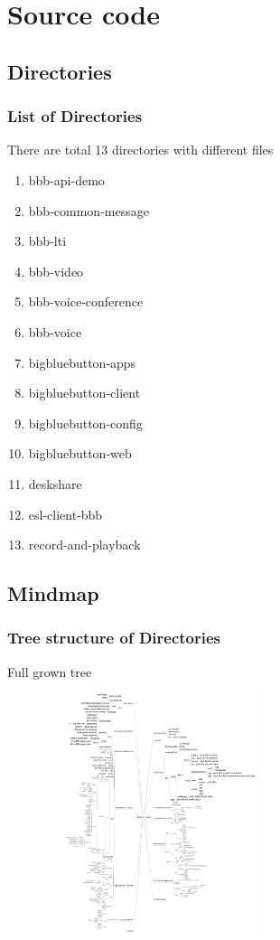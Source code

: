 \documentclass{beamer}
\begin{document}
\section{Source code}
\subsection*{Directories}
\begin{frame}
\frametitle{List of Directories}
{There are total 13 directories with different files}
\begin{small}
\begin{enumerate}

	\item{bbb-api-demo}
	\item{bbb-common-message}
	\item{bbb-lti}
	\item{bbb-video}
	\item{bbb-voice-conference}
	\item{bbb-voice}
	\item{bigbluebutton-apps}
	\item{bigbluebutton-client}
	\item{bigbluebutton-config}
	\item{bigbluebutton-web}
	\item{deskshare}
	\item{esl-client-bbb}
	\item record-and-playback 

\end{enumerate}
\end{small}
\end{frame}



\subsection*{Mindmap}
\begin{frame}
\frametitle{Tree structure of Directories}
{Full grown tree}


\includegraphics[height=70mm,width=90mm,angle=360]{./images/SourceCode.jpeg}
\end{frame}
\end{document}
